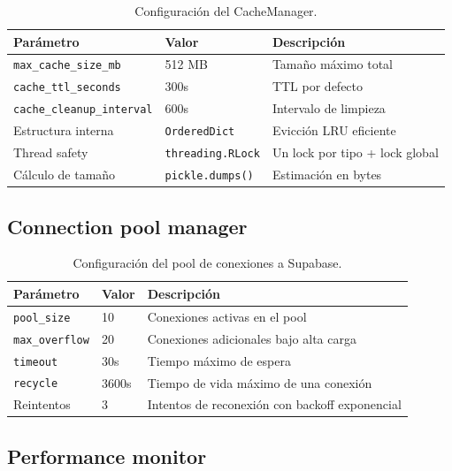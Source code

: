 \begin{table}[H]
\centering
\caption{Configuración del CacheManager.}
\label{tab:appendix_cacheconfig}
\footnotesize
\begin{tabularx}{\columnwidth}{llX}
\toprule
\textbf{Parámetro} & \textbf{Valor} & \textbf{Descripción} \\
\midrule
\texttt{max\_cache\_size\_mb} & 512 MB & Tamaño máximo total \\
\texttt{cache\_ttl\_seconds} & 300s & \ac{TTL} por defecto \\
\texttt{cache\_cleanup\_interval} & 600s & Intervalo de limpieza \\
Estructura interna & \texttt{OrderedDict} & Evicción \ac{LRU} eficiente \\
Thread safety & \texttt{threading.RLock} & Un lock por tipo + lock global \\
Cálculo de tamaño & \texttt{pickle.dumps()} & Estimación en bytes \\
\bottomrule
\end{tabularx}
\end{table}

\subsection{Connection pool manager}

\begin{table}[H]
\centering
\caption{Configuración del pool de conexiones a Supabase.}
\label{tab:appendix_connpool}
\footnotesize
\begin{tabularx}{\columnwidth}{llX}
\toprule
\textbf{Parámetro} & \textbf{Valor} & \textbf{Descripción} \\
\midrule
\texttt{pool\_size} & 10 & Conexiones activas en el pool \\
\texttt{max\_overflow} & 20 & Conexiones adicionales bajo alta carga \\
\texttt{timeout} & 30s & Tiempo máximo de espera \\
\texttt{recycle} & 3600s & Tiempo de vida máximo de una conexión \\
Reintentos & 3 & Intentos de reconexión con backoff exponencial \\
\bottomrule
\end{tabularx}
\end{table}

\subsection{Performance monitor}

